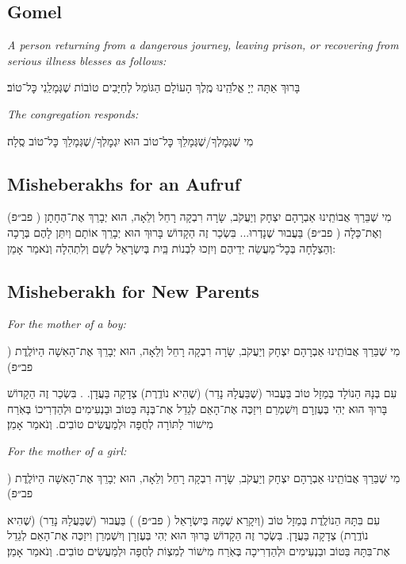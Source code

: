 \documentclass[11pt, openany]{article}
\newcommand{\englishinst}[1]{
	\begin{minipage}{\textwidth}
		\begin{english}\raggedright\centering
			\textit{#1}
				
				\vspace{2pt}
		\end{english}
	\end{minipage}
}
\newcommand{\rashi}[1]{%
		\textsf{#1}}
\newcommand{\eng}[1]{\begin{english}\beginL #1 \endL\end{english}}
\newcommand{\ploni}{(\rashi{פב״פ})
}
\begin{document}
\begin{minipage}{\textwidth}
\eng{\section*{Gomel}}
	
\begin{large}
	\englishinst{A person returning from a dangerous journey, leaving prison, or recovering from serious illness blesses as follows:}
	בָּרוּךְ אַתָּה יְיָ אֱלֹהֵֽינוּ מֶֽלֶךְ הָעוֹלָם הַגּוֹמֵל לְחַיָּבִים טוֹבוֹת שֶׁגְּמָלַֽנִי כׇּל־טוֹב׃\\
	
	\englishinst{The congregation responds:}
	מִי שֶׁגְּמׇלְךָ/שֶׁגְּמָלֵךְ כׇּל־טוֹב הוּא יִגְמׇלְךָ/שֶׁגְּמָלֵךְ כׇּל־טוֹב סֶֽלָה׃
\end{large}\end{minipage}

\begin{minipage}{\textwidth}
\eng{\section*{Misheberakhs for an Aufruf}}


\begin{large}
מִי שֶׁבֵּרַךְ אֲבוֹתֵֽינוּ אַבְרָהָם יִצְחָק וְיַעֲקֹב, שָׂרָה רִבְקָה רָחֵל וְלֵאָה, הוּא יְבָרֵךְ אֶת־הֶחָתָן \ploni וְאֶת־כַּלָה \ploni בַּעֲבוּר שֶׁנָדְרוּ... בִּשְׂכַר זֶה הַקָדוֹשׁ בָּרוּךְ הוּא יְבָרֵךְ אוֹתָם וְיִתֵּן לָהֶם בְּרָכָה וְהַצְלָחָה בְּכׇל־מַעֲשֵׂה יְדֵיהֶם וְיִזְכוּ לִבְנוֹת בַּֽיִת בְּיִשְׂרָאֵל לְשֵׁם וְלִתְהִלָה וְנֹאמַר אָמֵן:


\end{large}\end{minipage}

\begin{minipage}{\textwidth}
\eng{\section*{Misheberakh for New Parents}}


\begin{large}
\englishinst{For the mother of a boy:}
מִי שֶׁבֵּרַךְ אֲבוֹתֵֽינוּ אַבְרָהָם יִצְחָק וְיַעֲקֹב, שָׂרָה רִבְקָה רָחֵל וְלֵאָה, הוּא יְבָרֵךְ אֶת־הָאִשָׁה הַיוֹלֶֽדֶת
\ploni
עִם בְּנָהּ הַנוֹלָד בְּמַזָל טוֹב בַּעֲבוּר (שֶׁבַּעֲלָהּ נָדַר) (שֶׁהִיא נוֹדֶֽרֶת) צְדָקָה בַּעֲדָן. . בִּשְׂכַר זֶה הַקָדוֹשׁ בָּרוּךְ הוּא יְהִי בְּעֶזְרָם וְיִשְׁמְרֵם וִיזַכֶּה אֶת־הָאֵם לְגַדֵל אֶת־בְּנָהּ בַּטוֹב וּבַנְעִימִים וּלְהַדְרִיכוֹ בְּאֹֽרַח מִישׁוֹר לַתּוֹרָה לְחֻפָּה וּלְמַעֲשִׂים טוֹבִים. וְנֹאמַר אָמֵן׃\\

\englishinst{For the mother of a girl:}
מִי שֶׁבֵּרַךְ אֲבוֹתֵֽינוּ אַבְרָהָם יִצְחָק וְיַעֲקֹב, שָׂרָה רִבְקָה רָחֵל וְלֵאָה, הוּא יְבָרֵךְ אֶת־הָאִשָׁה הַיוֹלֶֽדֶת
\ploni
עִם בִּתָּהּ הַנוֹלֶֽדֶת בְּמַזָל טוֹב (וְיִקָרֵא שְׁמָהּ בְּיִשְׂרָאֵל \ploni ) בַּעֲבוּר (שֶׁבַּעֲלָהּ נָדַר) (שֶׁהִיא נוֹדֶֽרֶת) צְדָקָה בַּעֲדָן. בִּשְׂכַר זֶה הַקָדוֹשׁ בָּרוּךְ הוּא יְהִי בְּעֶזְרָן וְיִשְׁמְרֵן וִיזַכֶּה אֶת־הָאֵם לְגַדֵל אֶת־בִּתָּהּ בַּטוֹב ובַנְעִימִים וּלְהַדְרִיכָה בְּאֹֽרַח מִישׁוֹר לְמִצְוֹת לְחֻפָּה וּלְמַעֲשִׂים טוֹבִים. וְנֹאמַר אָמֵן׃
\end{large}\end{minipage}
\end{document}

